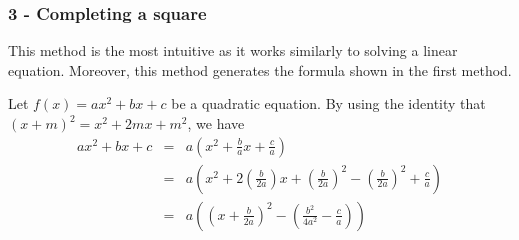 \begin{frame}
\frametitle{3 - Completing a square}
This method is the most intuitive as it works similarly to solving a linear equation. Moreover, this method generates the formula shown in the first method.

Let $f(x) = ax^2 + bx + c$ be a quadratic equation. By using the identity that $(x+m)^2 = x^2 + 2mx + m^2$, we have
\begin{eqnarray*}
ax^2 + bx + c &=& a\left(x^2 + \frac{b}{a}x + \frac{c}{a} \right) \\
&=& a \left(x^2 + 2\left(\frac{b}{2a}\right)x + \left(\frac{b}{2a}\right)^2 - \left(\frac{b}{2a}\right)^2 + \frac{c}{a} \right) \\
&=& a\left( \left(x + \frac{b}{2a}\right)^2- \left( \frac{b^2}{4a^2} - \frac{c}{a}\right)  \right)
\end{eqnarray*}
\end{frame}

